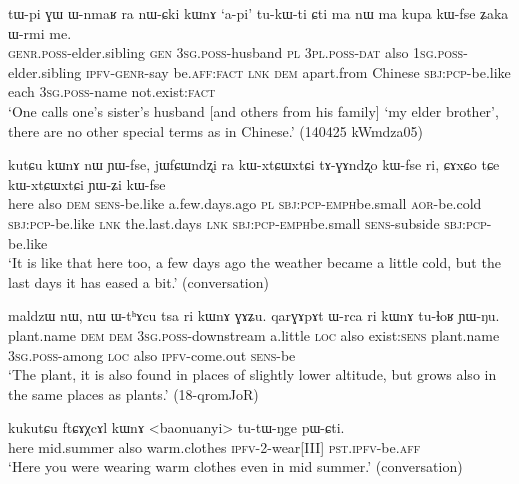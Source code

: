    \begin{exe}
\ex \label{ex:nWCki.kWnA}
\gll  tɯ-pi ɣɯ ɯ-nmaʁ ra nɯ-ɕki kɯnɤ `a-pi' tu-kɯ-ti ɕti ma nɯ ma kupa kɯ-fse ʑaka ɯ-rmi me.\\
\textsc{genr}.\textsc{poss}-elder.sibling \textsc{gen} \textsc{3sg}.\textsc{poss}-husband \textsc{pl} \textsc{3pl}.\textsc{poss}-\textsc{dat} also \textsc{1sg}.\textsc{poss}-elder.sibling \textsc{ipfv}-\textsc{genr}-say be.\textsc{aff}:\textsc{fact} \textsc{lnk} \textsc{dem} apart.from Chinese \textsc{sbj}:\textsc{pcp}-be.like each \textsc{3sg}.\textsc{poss}-name not.exist:\textsc{fact}\\
\glt  `One calls one's sister's husband [and others from his family] `my elder brother', there are no other special terms as in Chinese.' (140425 kWmdza05) 
\end{exe}


  \begin{exe}
\ex \label{ex:kutCu.kWnA}
\gll  kutɕu kɯnɤ nɯ ɲɯ-fse, jɯfɕɯndʐi ra kɯ-xtɕɯ\redp{}xtɕi tɤ-ɣɤndʐo kɯ-fse ri, ɕɤxɕo tɕe kɯ-xtɕɯ\redp{}xtɕi ɲɯ-ʑi kɯ-fse \\
here also \textsc{dem} \textsc{sens}-be.like a.few.days.ago \textsc{pl} \textsc{sbj}:\textsc{pcp}-\textsc{emph}\redp{}be.small \textsc{aor}-be.cold \textsc{sbj}:\textsc{pcp}-be.like \textsc{lnk} the.last.days \textsc{lnk} \textsc{sbj}:\textsc{pcp}-\textsc{emph}\redp{}be.small \textsc{sens}-subside \textsc{sbj}:\textsc{pcp}-be.like \\
\glt `It is like that here too, a few days ago the weather became a little cold, but the last days it has eased a bit.' (conversation)
  \end{exe}
  
    \begin{exe}
\ex \label{ex:ri.kWnA}
\gll   maldzɯ nɯ, nɯ ɯ-tʰɤcu tsa ri kɯnɤ ɣɤʑu. qarɣɤpɤt ɯ-rca ri kɯnɤ tu-ɬoʁ ɲɯ-ŋu. \\
plant.name \textsc{dem} \textsc{dem} \textsc{3sg}.\textsc{poss}-downstream a.little \textsc{loc} also exist:\textsc{sens} plant.name \textsc{3sg}.\textsc{poss}-among \textsc{loc} also \textsc{ipfv}-come.out \textsc{sens}-be \\
\glt `The  plant, it is also found in places of slightly lower altitude, but grows also in the same places as   plants.' (18-qromJoR)
    \end{exe}
    
\begin{exe}
\ex \label{ex:ftCAXcAl.kWnA}
\gll   kukutɕu ftɕɤχcɤl kɯnɤ <baonuanyi> tu-tɯ-ŋge pɯ-ɕti. \\
  here mid.summer also warm.clothes \textsc{ipfv}-2-wear[III] \textsc{pst}.\textsc{ipfv}-be.\textsc{aff} \\
  \glt `Here you were wearing warm clothes even in mid summer.' (conversation)
    \end{exe}
    

